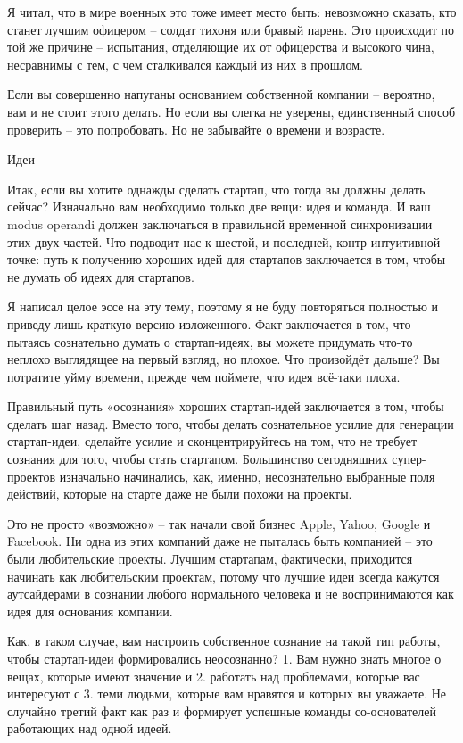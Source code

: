 \documentclass[ebook,12pt,oneside,openany]{memoir}
\begin{document}
Я читал, что в мире военных это тоже имеет место быть: невозможно
сказать, кто станет лучшим офицером – солдат тихоня или бравый парень.
Это происходит по той же причине – испытания, отделяющие их от
офицерства и высокого чина, несравнимы с тем, с чем сталкивался каждый
из них в прошлом.

Если вы совершенно напуганы основанием собственной компании –
вероятно, вам и не стоит этого делать. Но если вы слегка не уверены,
единственный способ проверить – это попробовать. Но не забывайте о
времени и возрасте.

Идеи

Итак, если вы хотите однажды сделать стартап, что тогда вы должны
делать сейчас? Изначально вам необходимо только две вещи: идея и
команда. И ваш modus operandi должен заключаться в правильной
временной синхронизации этих двух частей. Что подводит нас к шестой, и
последней, контр-интуитивной точке: путь к получению хороших идей для
стартапов заключается в том, чтобы не думать об идеях для стартапов.

Я написал целое эссе на эту тему, поэтому я не буду повторяться
полностью и приведу лишь краткую версию изложенного. Факт заключается
в том, что пытаясь сознательно думать о стартап-идеях, вы можете
придумать что-то неплохо выглядящее на первый взгляд, но плохое. Что
произойдёт дальше? Вы потратите уйму времени, прежде чем поймете, что
идея всё-таки плоха.

Правильный путь «осознания» хороших стартап-идей заключается в том,
чтобы сделать шаг назад. Вместо того, чтобы делать сознательное усилие
для генерации стартап-идеи, сделайте усилие и сконцентрируйтесь на
том, что не требует сознания для того, чтобы стать стартапом.
Большинство сегодняшних супер-проектов изначально начинались, как,
именно, несознательно выбранные поля действий, которые на старте даже
не были похожи на проекты.

Это не просто «возможно» – так начали свой бизнес Apple, Yahoo, Google
и Facebook. Ни одна из этих компаний даже не пыталась быть компанией –
это были любительские проекты. Лучшим стартапам, фактически,
приходится начинать как любительским проектам, потому что лучшие идеи
всегда кажутся аутсайдерами в сознании любого нормального человека и
не воспринимаются как идея для основания компании.

Как, в таком случае, вам настроить собственное сознание на такой тип
работы, чтобы стартап-идеи формировались неосознанно? 1. Вам нужно
знать многое о вещах, которые имеют значение и 2. работать над
проблемами, которые вас интересуют с 3. теми людьми, которые вам
нравятся и которых вы уважаете. Не случайно третий факт как раз и
формирует успешные команды со-основателей работающих над одной идеей.
\end{document}

